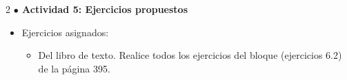 \documentclass[10pt,letterpaper]{article}
\newcommand{\URLVideoDiez}{\href{https://youtu.be/8PIiLIDGE1k}{\textbf{Video 9:}} ED03: Método de Euler mejorado}
\newcommand{\URLVideoNueve}{\href{https://youtu.be/VDL00Fs0AxE}{\textbf{Video 9:}} Programación Método de Taylor en Octave }
\begin{document}
\begin{multicols}{2}
{\color{actividades} \textbf{  $\bullet$ Actividad 5: Ejercicios propuestos}}
\begin{itemize}
\item Ejercicios asignados:
\begin{itemize}
\item Del libro de texto. Realice todos los ejercicios del bloque (ejercicios 6.2) de la página 395.
\end{itemize}
\end{itemize}



%



\end{multicols}
\end{document}
